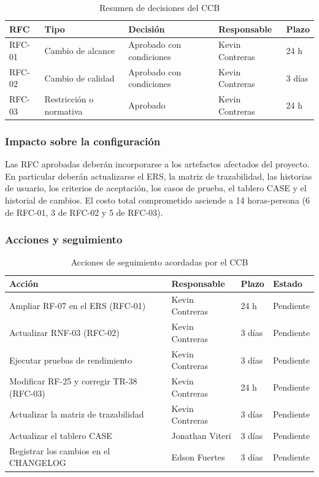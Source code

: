 \documentclass[journal,onecolumn]{IEEEtran}
\begin{document}
	\begin{table}[H]
		\centering
		\caption{Resumen de decisiones del CCB}
		\label{tab:ccb-resumen}
		\begin{tabular}{L{1.6cm} L{3.4cm} L{3.4cm} L{3.0cm} C{1.6cm}}
			\toprule
			\textbf{RFC} & \textbf{Tipo} & \textbf{Decisión} & \textbf{Responsable} &
			\textbf{Plazo} \\
			\midrule
			RFC-01 & Cambio de alcance & Aprobado con condiciones & Kevin Contreras & 24 h \\
			RFC-02 & Cambio de calidad & Aprobado con condiciones & Kevin Contreras & 3 días \\
			RFC-03 & Restricción o normativa & Aprobado & Kevin Contreras & 24 h \\
			\bottomrule
		\end{tabular}
	\end{table}
	
	\subsubsection{Impacto sobre la configuración}
	
	Las RFC aprobadas deberán incorporarse a los artefactos afectados del proyecto. En particular
	deberán actualizarse el ERS, la matriz de trazabilidad, las historias de usuario, los criterios de
	aceptación, los casos de prueba, el tablero CASE y el historial de cambios. El costo total
	comprometido asciende a 14 horas-persona (6 de RFC-01, 3 de RFC-02 y 5 de RFC-03).
	
	\subsubsection{Acciones y seguimiento}
	
	\begin{table}[H]
		\centering
		\caption{Acciones de seguimiento acordadas por el CCB}
		\label{tab:ccb-seguimiento}
		\begin{tabular}{L{5.6cm} L{3.4cm} C{1.8cm} C{2.0cm}}
			\toprule
			\textbf{Acción} & \textbf{Responsable} & \textbf{Plazo} & \textbf{Estado} \\
			\midrule
			Ampliar RF-07 en el ERS (RFC-01)          & Kevin Contreras  & 24 h   & Pendiente \\
			Actualizar RNF-03 (RFC-02)                & Kevin Contreras  & 3 días & Pendiente \\
			Ejecutar pruebas de rendimiento           & Kevin Contreras  & 3 días & Pendiente \\
			Modificar RF-25 y corregir TR-38 (RFC-03) & Kevin Contreras  & 24 h   & Pendiente \\
			Actualizar la matriz de trazabilidad      & Kevin Contreras  & 3 días & Pendiente \\
			Actualizar el tablero CASE                & Jonathan Viteri  & 3 días & Pendiente \\
			Registrar los cambios en el CHANGELOG     & Edson Fuertes    & 3 días & Pendiente \\
			\bottomrule
		\end{tabular}
	\end{table}
	
\end{document}
